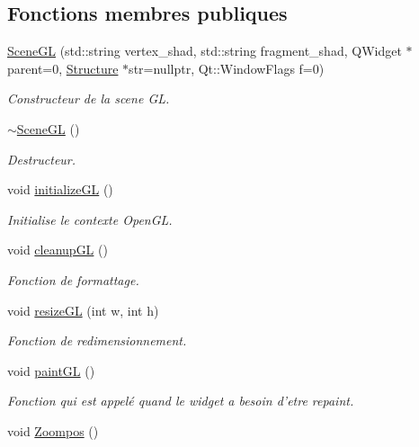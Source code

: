 \subsection*{Fonctions membres publiques}
\begin{DoxyCompactItemize}
\item 
\hyperlink{classSceneGL_a5bc9486686f1a7cbcbca2ecf7a55ad09}{Scene\+G\+L} (std\+::string vertex\+\_\+shad, std\+::string fragment\+\_\+shad, Q\+Widget $\ast$parent=0, \hyperlink{classStructure}{Structure} $\ast$str=nullptr, Qt\+::\+Window\+Flags f=0)
\begin{DoxyCompactList}\small\item\em Constructeur de la scene G\+L. \end{DoxyCompactList}\item 
\hyperlink{classSceneGL_a0e4266dea6edaca8b5274b9d74e4fe56}{$\sim$\+Scene\+G\+L} ()
\begin{DoxyCompactList}\small\item\em Destructeur. \end{DoxyCompactList}\item 
void \hyperlink{classSceneGL_ad81e01d02213ca0bdbec735260408f23}{initialize\+G\+L} ()
\begin{DoxyCompactList}\small\item\em Initialise le contexte Open\+G\+L. \end{DoxyCompactList}\item 
void \hyperlink{classSceneGL_a70997c4a649f1b17710a14549bf6990b}{cleanup\+G\+L} ()
\begin{DoxyCompactList}\small\item\em Fonction de formattage. \end{DoxyCompactList}\item 
void \hyperlink{classSceneGL_a45a49b85da1c7cb756b622c97028bf1b}{resize\+G\+L} (int w, int h)
\begin{DoxyCompactList}\small\item\em Fonction de redimensionnement. \end{DoxyCompactList}\item 
void \hyperlink{classSceneGL_a4e3548c5440b13ff4fe0fb76bc766276}{paint\+G\+L} ()
\begin{DoxyCompactList}\small\item\em Fonction qui est appelé quand le widget a besoin d'etre repaint. \end{DoxyCompactList}\item 
void \hyperlink{classSceneGL_a8ee0b8b7fdabc17840b1c037759b4dc6}{Zoompos} ()

\end{DoxyCompactItemize}
